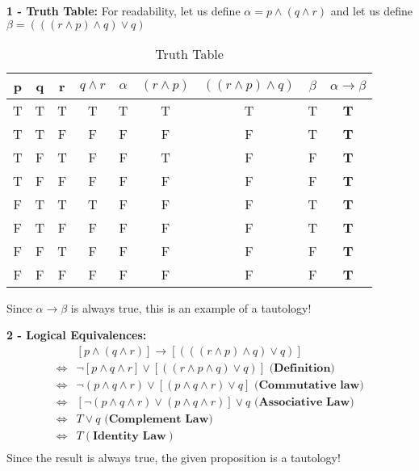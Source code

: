 \begin{solution}
    \textbf{1 - Truth Table:} For readability, let us define $\alpha =  p
    \wedge (q \wedge r)$ and let us define $\beta = ( ( (r \wedge p)\wedge q)
    \vee q)$

    \pagebreak[4]

    \begin{table}[ht]
        \caption{Truth Table}
        \vspace{0.5em}
        \centering %
        \begin{tabular}{c c c c c c c c c } %
            \toprule
            p & q & r & $q \wedge r$ &  $\alpha$ & $(r \wedge p)$ & $((r \wedge
            p) \wedge q)$ & $\beta$ & $\alpha \rightarrow \beta$\\ [0.5ex]
            \midrule
            T & T & T & T & T & T & T & T & \textbf{T} \\
            T & T & F & F & F & F & F & T & \textbf{T} \\
            T & F & T & F & F & T & F & F & \textbf{T} \\
            T & F & F & F & F & F & F & F & \textbf{T} \\
            F & T & T & T & F & F & F & T & \textbf{T} \\
            F & T & F & F & F & F & F & T & \textbf{T} \\
            F & F & T & F & F & F & F & F & \textbf{T} \\
            F & F & F & F & F & F & F & F & \textbf{T} \\
            \bottomrule
        \end{tabular}
        \label{table:question_1_truthtable}
    \end{table}

    \noindent Since $\alpha \rightarrow \beta$ is always true, this is an example
    of a tautology!
\end{solution}

\begin{solution}
    \textbf{2 - Logical Equivalences: }
    \[
        \begin{split}
            &[p \wedge (q \wedge r)] \rightarrow [( ( (r \wedge p)\wedge q) \vee
            q)] \\
            \iff &\neg[p \wedge q \wedge r] \vee [(  (r \wedge p\wedge q) \vee q)]
            \textbf{ (Definition)} \\
            \iff &\neg (p \wedge q \wedge r) \vee [(p \wedge q \wedge r) \vee q]
            \textbf{ (Commutative law)} \\
            \iff &[\neg (p \wedge q \wedge r) \vee (p \wedge q \wedge r)] \vee
            q \textbf{ (Associative Law)} \\
            \iff &T \vee q \textbf{ (Complement Law)} \\
            \iff &T (\textbf{Identity Law}) \\
        \end{split}
    \]
    \noindent Since the result is always true, the given proposition is a
    tautology! \\
\end{solution}

